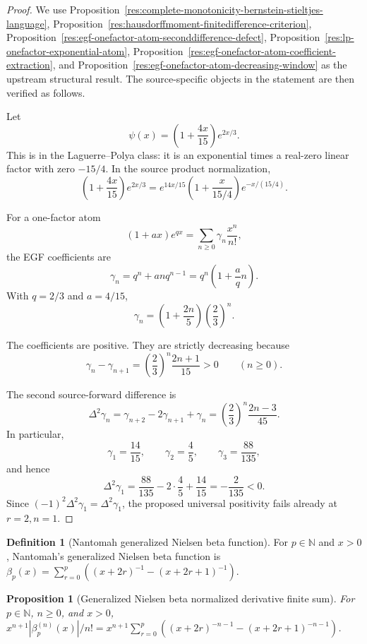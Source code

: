 \documentclass[11pt]{article}
\numberwithin{equation}{section}
\newtheorem{proposition}[theorem]{Proposition}
\theoremstyle{definition}
\newtheorem{definition}{Definition}[section]
\theoremstyle{remark}
\newcommand{\1}{\mathbf 1}
\begin{document}
\begin{proof}
We use Proposition~\ref{res:complete-monotonicity-bernstein-stieltjes-language}, Proposition~\ref{res:hausdorffmoment-finitedifference-criterion}, Proposition~\ref{res:egf-onefactor-atom-seconddifference-defect}, Proposition~\ref{res:lp-onefactor-exponential-atom}, Proposition~\ref{res:egf-onefactor-atom-coefficient-extraction}, and Proposition~\ref{res:egf-onefactor-atom-decreasing-window} as the upstream structural result. The source-specific objects in the statement are then verified as follows.

Let
\[
\psi(x)=\left(1+\frac{4x}{15}\right)e^{2x/3}.
\]
This is in the Laguerre--Polya class: it is an exponential times a real-zero linear factor with zero \(-15/4\). In the source product normalization,
\[
\left(1+\frac{4x}{15}\right)e^{2x/3}
=e^{14x/15}\left(1+\frac{x}{15/4}\right)e^{-x/(15/4)}.
\]

For a one-factor atom
\[
(1+a x)e^{q x}=\sum_{n\ge0}\gamma_n\frac{x^n}{n!},
\]
the EGF coefficients are
\[
\gamma_n=q^n+a n q^{n-1}
=q^n\left(1+\frac{a}{q}n\right).
\]
With \(q=2/3\) and \(a=4/15\),
\[
\gamma_n=\left(1+\frac{2n}{5}\right)\left(\frac23\right)^n.
\]

The coefficients are positive. They are strictly decreasing because
\[
\gamma_n-\gamma_{n+1}
=\left(\frac23\right)^n\frac{2n+1}{15}>0
\qquad(n\ge0).
\]

The second source-forward difference is
\[
\Delta^2\gamma_n=\gamma_{n+2}-2\gamma_{n+1}+\gamma_n
=\left(\frac23\right)^n\frac{2n-3}{45}.
\]
In particular,
\[
\gamma_1=\frac{14}{15},\qquad
\gamma_2=\frac45,\qquad
\gamma_3=\frac{88}{135},
\]
and hence
\[
\Delta^2\gamma_1
=\frac{88}{135}-2\cdot\frac45+\frac{14}{15}
=-\frac{2}{135}<0.
\]
Since \((-1)^2\Delta^2\gamma_1=\Delta^2\gamma_1\), the proposed universal positivity fails already at \(r=2,n=1\).
\end{proof}

\begin{definition}[Nantomah generalized Nielsen beta function]
\label{res:nantomah-pbeta-2018}
For \(p\in\mathbb N\) and \(x>0\), Nantomah's generalized Nielsen beta function is \(\beta_p(x)=\sum_{r=0}^{p}((x+2r)^{-1}-(x+2r+1)^{-1})\).
\end{definition}

\begin{proposition}[Generalized Nielsen beta normalized derivative finite sum]
\label{res:pbeta-normalized-derivative-finitesum}
For \(p\in\mathbb N\), \(n\ge0\), and \(x>0\), \(x^{n+1}|\beta_p^{(n)}(x)|/n!=x^{n+1}\sum_{r=0}^{p}((x+2r)^{-n-1}-(x+2r+1)^{-n-1})\).
\end{proposition}
\end{document}
